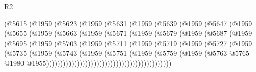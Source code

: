 \begin{lexlean}{R2}
\begin{coremodule}
                (@5615
                  (@1959
                    (@5623
                      (@1959
                        (@5631
                          (@1959
                            (@5639
                              (@1959
                                (@5647
                                  (@1959
                                    (@5655
                                      (@1959
                                        (@5663
                                          (@1959
                                            (@5671
                                              (@1959
                                                (@5679
                                                  (@1959
                                                    (@5687
                                                      (@1959
                                                        (@5695
                                                          (@1959
                                                            (@5703
                                                              (@1959
                                                                (@5711
                                                                  (@1959
                                                                    (@5719
                                                                      (@1959
                                                                        (@5727
                                                                          (@1959
                                                                            (@5735
                                                                              (@1959
                                                                                (@5743
                                                                                  (@1959
                                                                                    (@5751
                                                                                      (@1959
                                                                                        (@5759
                                                                                          (@1959
                                                                                            (@5763
                                                                                              @5765
                                                                                              @1980
                                                                                              @1955)))))))))))))))))))))))))))))))))))))))))))))

\end{coremodule}
\end{lexlean}
